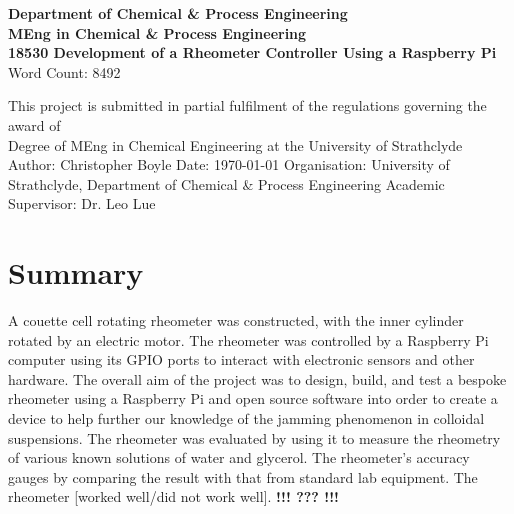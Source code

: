 \documentclass[twoside,a4]{report}
\def\atitle{Development of a Rheometer Controller Using a Raspberry Pi}
\def\shorttitle{Development of a Rheometer Controller}
\def\thewords{8492} %
\def\br{\newline \newline \noindent}
\def\cbh{\large\bfseries !!! ??? !!! \normalsize\normalfont}
\def\achapter{\shorttitle}  %
\def\jc#1{
	\def\achapter{#1}
	\addcontentsline{toc}{chapter}{\achapter} 
	\chapter*{\achapter} 
}
\begin{document}
	\begin{titlepage}
		\centering
		\vskip3cm
		{
			\bfseries\Large
			Department of Chemical \& Process Engineering\\
			\vskip1cm
			MEng in Chemical \& Process Engineering\\
			18530
			\vskip3cm
			\LARGE\atitle
		}
		\vskip3cm
		{\small Word Count: \thewords}
		\vskip1cm
		\begin{flushleft}
			This project is submitted in partial fulfilment of the regulations governing the award of \\
			Degree of MEng in Chemical Engineering at the University of Strathclyde
			\vskip2cm
			Author: Christopher Boyle \hfill Date: \today \newline
			\vskip1cm
			Organisation: University of Strathclyde, Department of Chemical \& Process Engineering \newline
			Academic Supervisor: Dr. Leo Lue
		\end{flushleft}
	\end{titlepage}

	\setcounter{page}{0}
	\begin{center}\newpage \end{center}
	
	\jc{Summary} %
	A couette cell rotating rheometer was constructed, with the inner cylinder rotated by an electric motor. The rheometer was controlled by a Raspberry Pi computer using its GPIO ports to interact with electronic sensors and other hardware. \br
	The overall aim of the project was to design, build, and test a bespoke rheometer using a Raspberry Pi and open source software into order to create a device to help further our knowledge of the jamming phenomenon in colloidal suspensions.\br
	The rheometer was evaluated by using it to measure the rheometry of various known solutions of water and glycerol. The rheometer's accuracy gauges by comparing the result with that from standard lab equipment. The rheometer [worked well/did not work well]. \cbh
	\newpage \begin{center} \large \space \normalsize \end{center}
	
\end{document}
